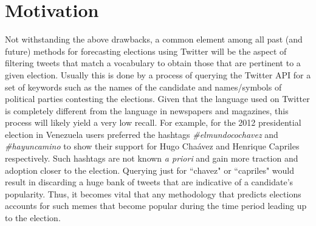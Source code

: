 \section{Motivation}
Not withstanding the above drawbacks, a common element among all past (and future) methods
for forecasting elections using Twitter will be the
aspect of filtering tweets that match a vocabulary to obtain those that are pertinent to a given election.
Usually this is done by a process of querying the Twitter API for a set of keywords such as the names of 
the candidate and names/symbols of political parties contesting the elections.
Given that the language used on Twitter is completely different from the language in newspapers and magazines, this process will likely yield a very low recall.
For example, for the 2012 presidential election in Venezuela users preferred  the hashtags \emph{\#elmundocochavez} and \emph{\#hayuncamino} to show their support for Hugo Cha\'{a}vez and Henrique Capriles respectively.
Such hashtags are not known {\it a priori} and gain more traction and adoption closer to the election.
Querying just for ``chavez" or ``capriles" would result in discarding a huge bank of tweets that are indicative 
of a candidate's popularity.
Thus, it becomes vital that any methodology that predicts elections accounts for such memes that become popular 
during the time period leading up to the election.
\begin{comment}
In this work we build on earlier work in social group modeling~\cite{huang2012social} and address this issue by:
\begin{itemize}
\item
Designing and implementing a new dynamic query expansion algorithm using Probabilistic Soft Logic for vocabulary
building and expansion
\item
Showing how the vocabulary obtained from the Dynamic Query Expansion exercise improves the retrieval of relevant
tweets and improving the accuracy of prediction algorithms.
\item Conducting an exhaustive evaluation of our methodology across a set of national, state-level, and mayoral
elections in multiple countries of Latin America.
\end{itemize}
\end{comment}

